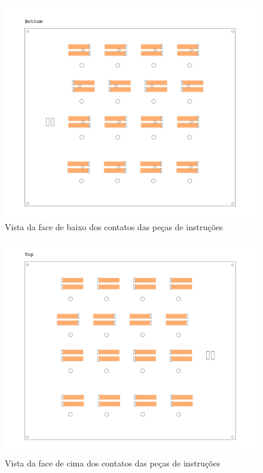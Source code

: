 \documentclass[paper=a4, fontsize=11pt]{scrartcl} %
\numberwithin{equation}{section} %
\numberwithin{figure}{section} %
\numberwithin{table}{section} %
\begin{document}
 \begin{figure}[h!] %
 \centering
 \includegraphics[scale=0.10]{./imagens/board-1.jpg}
 \caption[ ]{Vista da face de baixo dos contatos das peças de instruções}
 \end{figure}

\begin{figure}[h!] %
 \centering
 \includegraphics[scale=0.10]{./imagens/board-2.jpg}
 \caption[ ]{Vista da face de cima dos contatos das peças de instruções}
 \end{figure}
\end{document}

